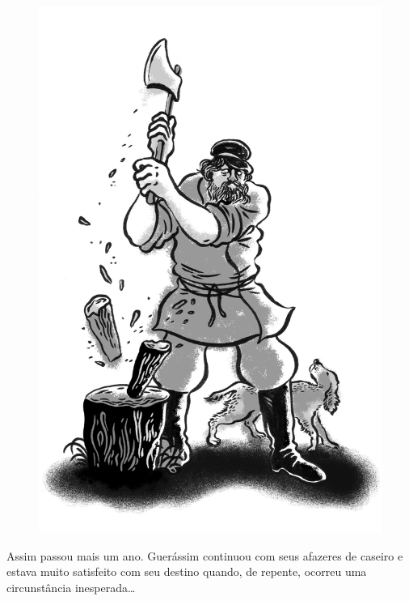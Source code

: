 \begin{figure}%
\vspace*{-1.8cm}
\hspace*{-1.8cm}\includegraphics{./imgs/cena3.jpg}
\end{figure}

Assim passou mais um ano. Guerássim continuou com seus afazeres de
caseiro e estava muito satisfeito com seu destino quando, de repente,
ocorreu uma circunstância inesperada\ldots{}

